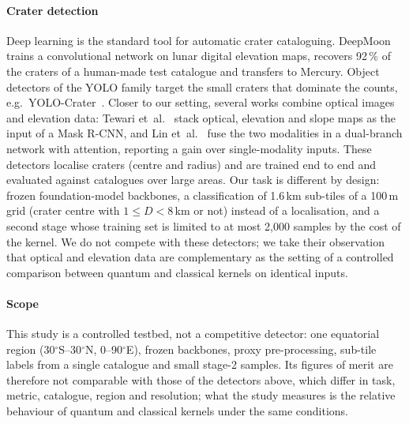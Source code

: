 
\paragraph{Crater detection}
Deep learning is the standard tool for automatic crater cataloguing. DeepMoon~\cite{silburt2019deepmoon} trains a
convolutional network on lunar digital elevation maps, recovers 92\,\% of the craters of a human-made test catalogue
and transfers to Mercury. Object detectors of the YOLO family target the small craters that dominate the counts,
e.g.\ YOLO-Crater~\cite{mu2023yolocrater}. Closer to our setting, several works combine optical images and elevation
data: Tewari et~al.~\cite{tewari2020automated} stack optical, elevation and slope maps as the input of a Mask R-CNN,
and Lin et~al.~\cite{lin2024adsnet} fuse the two modalities in a dual-branch network with attention, reporting a gain
over single-modality inputs. These detectors localise craters (centre and radius) and are trained end to end and
evaluated against catalogues over large areas. Our task is different by design: frozen foundation-model backbones,
a classification of 1.6\,km sub-tiles of a 100\,m grid (crater centre with $1 \le D < 8$\,km or not) instead of a localisation, and a
second stage whose training set is limited to at most 2{,}000 samples by the cost of the kernel. We do not compete
with these detectors; we take their observation that optical and elevation data are complementary as the setting of
a controlled comparison between quantum and classical kernels on identical inputs.

\paragraph{Scope}
This study is a controlled testbed, not a competitive detector: one equatorial region (30$^\circ$S--30$^\circ$N,
0--90$^\circ$E), frozen backbones, proxy pre-processing, sub-tile labels from a single catalogue and small stage-2
samples. Its figures of merit are therefore not comparable with those of the detectors above, which differ in task,
metric, catalogue, region and resolution; what the study measures is the relative behaviour of quantum and classical
kernels under the same conditions.
